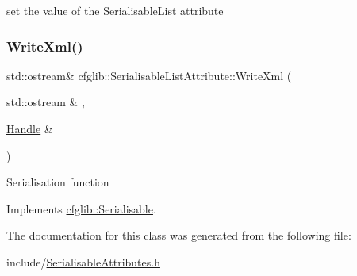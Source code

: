 set the value of the Serialisable\+List attribute \mbox{\label{classcfglib_1_1SerialisableListAttribute_a9e407c7a002d8ec7ed0b934842380736}} 
\subsubsection{\texorpdfstring{Write\+Xml()}{WriteXml()}}
{\footnotesize\ttfamily std\+::ostream\& cfglib\+::\+Serialisable\+List\+Attribute\+::\+Write\+Xml (\begin{DoxyParamCaption}\item[{std\+::ostream \&}]{,  }\item[{\hyperlink{classcfglib_1_1Handle}{Handle} \&}]{ }\end{DoxyParamCaption})\hspace{0.3cm}{\ttfamily [virtual]}}

Serialisation function 

Implements \hyperlink{classcfglib_1_1Serialisable_aaeb80cc7397ad312e5ae34f39412ce42}{cfglib\+::\+Serialisable}.



The documentation for this class was generated from the following file\+:\begin{DoxyCompactItemize}
\item 
include/\hyperlink{SerialisableAttributes_8h}{Serialisable\+Attributes.\+h}\end{DoxyCompactItemize}
